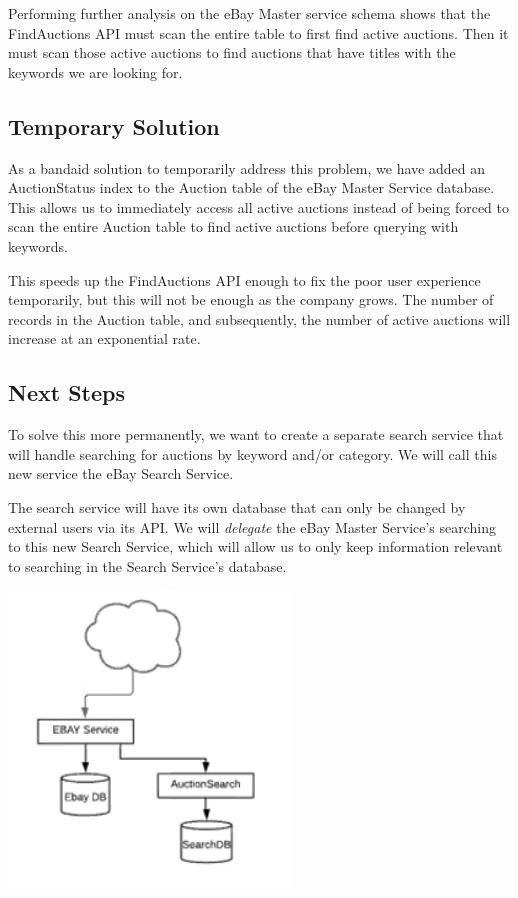 \documentclass[12pt,a4paper]{article}
\begin{document}
\vspace{\baselineskip}

Performing further analysis on the eBay Master service schema shows that the
FindAuctions API must scan the entire table to first find active auctions. Then
it must scan those active auctions to find auctions that have titles with the
keywords we are looking for.

\subsection{Temporary Solution}

As a bandaid solution to temporarily address this problem, we have added an 
AuctionStatus index to the Auction table of the eBay Master Service database.
This allows us to immediately access all active auctions instead of being forced 
to scan the entire Auction table to find active auctions before querying with keywords. 

\vspace{\baselineskip}
This speeds up the FindAuctions API enough to fix the poor user experience
temporarily, but this will not be enough as the company grows. The number of
records in the Auction table, and subsequently, the number of active auctions
will increase at an exponential rate.



\pagebreak
\subsection{Next Steps}
To solve this more permanently, we want to create a separate search service
that will handle searching for auctions by keyword and/or category. 
We will call this new service the eBay Search Service. 

\vspace{\baselineskip} 
The search service will have its own database that can only be changed
by external users via its API.
We will \emph{delegate} the eBay Master Service's searching to this new Search Service, 
which will allow us to only keep information relevant to searching in the Search Service's database. 

\begin{center}
    \includegraphics[scale=0.75]{images/new-service.png}
\end{center}
\end{document}

